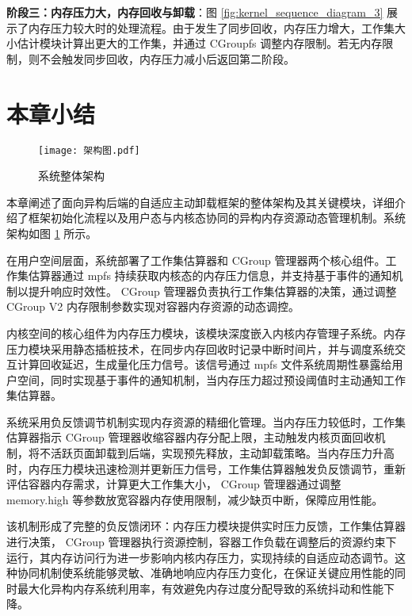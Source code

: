 \textbf{阶段三：内存压力大，内存回收与卸载}：图 \ref{fig:kernel_sequence_diagram_3} 展示了内存压力较大时的处理流程。由于发生了同步回收，内存压力增大，工作集大小估计模块计算出更大的工作集，并通过  CGroupfs  调整内存限制。若无内存限制，则不会触发同步回收，内存压力减小后返回第二阶段。

\section{本章小结}

\begin{figure}[htb]
    \centering
    \texttt{[image: 架构图.pdf]}
    \caption{系统整体架构}
    \label{fig:system_architecture}
\end{figure}

本章阐述了面向异构后端的自适应主动卸载框架的整体架构及其关键模块，详细介绍了框架初始化流程以及用户态与内核态协同的异构内存资源动态管理机制。系统架构如图 \ref{fig:system_architecture} 所示。

在用户空间层面，系统部署了工作集估算器和 CGroup 管理器两个核心组件。工作集估算器通过 mpfs 持续获取内核态的内存压力信息，并支持基于事件的通知机制以提升响应时效性。 CGroup 管理器负责执行工作集估算器的决策，通过调整 CGroup V2 内存限制参数实现对容器内存资源的动态调控。

内核空间的核心组件为内存压力模块，该模块深度嵌入内核内存管理子系统。内存压力模块采用静态插桩技术，在同步内存回收时记录中断时间片，并与调度系统交互计算回收延迟，生成量化压力信号。该信号通过 mpfs 文件系统周期性暴露给用户空间，同时实现基于事件的通知机制，当内存压力超过预设阈值时主动通知工作集估算器。

系统采用负反馈调节机制实现内存资源的精细化管理。当内存压力较低时，工作集估算器指示 CGroup 管理器收缩容器内存分配上限，主动触发内核页面回收机制，将不活跃页面卸载到后端，实现预先释放，主动卸载策略。当内存压力升高时，内存压力模块迅速检测并更新压力信号，工作集估算器触发负反馈调节，重新评估容器内存需求，计算更大工作集大小， CGroup  管理器通过调整 memory.high 等参数放宽容器内存使用限制，减少缺页中断，保障应用性能。

该机制形成了完整的负反馈闭环：内存压力模块提供实时压力反馈，工作集估算器进行决策， CGroup 管理器执行资源控制，容器工作负载在调整后的资源约束下运行，其内存访问行为进一步影响内核内存压力，实现持续的自适应动态调节。这种协同机制使系统能够灵敏、准确地响应内存压力变化，在保证关键应用性能的同时最大化异构内存系统利用率，有效避免内存过度分配导致的系统抖动和性能下降。
